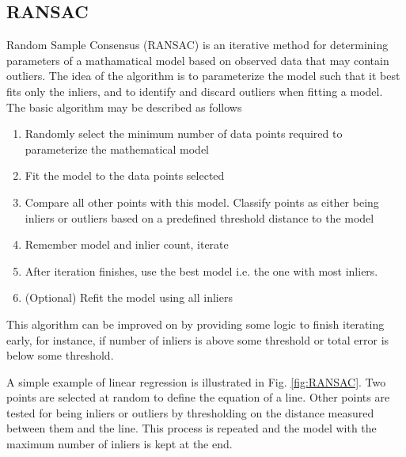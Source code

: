 \subsection{RANSAC}
\label{subsec:RANSAC}

Random Sample Consensus (RANSAC)\cite{ransac} is an iterative method for determining parameters of a mathamatical model based on observed data that may contain outliers.  The idea of the algorithm is to parameterize the model such that it best fits only the inliers, and to identify and discard outliers when fitting a model.  The basic algorithm may be described as follows

\begin{enumerate}
 \item Randomly select the minimum number of data points required to parameterize the mathematical model
 \item Fit the model to the data points selected
 \item Compare all other points with this model.  Classify points as either being inliers or outliers based on a predefined threshold distance to the model
 \item Remember model and inlier count, iterate
 \item After iteration finishes, use the best model i.e. the one with most inliers.
 \item (Optional) Refit the model using all inliers
\end{enumerate}

This algorithm can be improved on by providing some logic to finish iterating early, for instance, if number of inliers is above some threshold or total error is below some threshold.

A simple example of linear regression is illustrated in Fig. \ref{fig:RANSAC}.  Two points are selected at random to define the equation of a line.  Other points are tested for being inliers or outliers by thresholding on the distance measured between them and the line.  This process is repeated and the model with the maximum number of inliers is kept at the end.

